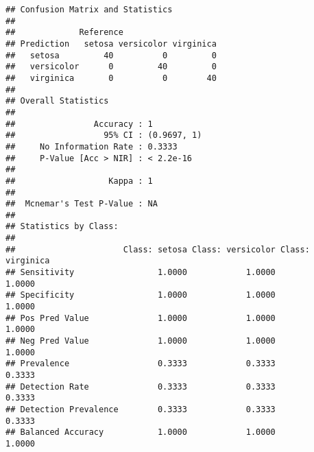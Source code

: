 \documentclass[
]{article}
\newenvironment{Shaded}{\begin{snugshade}}{\end{snugshade}}
\newcommand{\AttributeTok}[1]{\textcolor[rgb]{0.77,0.63,0.00}{#1}}
\newcommand{\CommentTok}[1]{\textcolor[rgb]{0.56,0.35,0.01}{\textit{#1}}}
\newcommand{\DecValTok}[1]{\textcolor[rgb]{0.00,0.00,0.81}{#1}}
\newcommand{\FunctionTok}[1]{\textcolor[rgb]{0.00,0.00,0.00}{#1}}
\newcommand{\NormalTok}[1]{#1}
\newcommand{\OtherTok}[1]{\textcolor[rgb]{0.56,0.35,0.01}{#1}}
\newcommand{\SpecialCharTok}[1]{\textcolor[rgb]{0.00,0.00,0.00}{#1}}
\begin{document}
\begin{Shaded}
\end{Shaded}

\begin{verbatim}
## Confusion Matrix and Statistics
## 
##             Reference
## Prediction   setosa versicolor virginica
##   setosa         40          0         0
##   versicolor      0         40         0
##   virginica       0          0        40
## 
## Overall Statistics
##                                      
##                Accuracy : 1          
##                  95% CI : (0.9697, 1)
##     No Information Rate : 0.3333     
##     P-Value [Acc > NIR] : < 2.2e-16  
##                                      
##                   Kappa : 1          
##                                      
##  Mcnemar's Test P-Value : NA         
## 
## Statistics by Class:
## 
##                      Class: setosa Class: versicolor Class: virginica
## Sensitivity                 1.0000            1.0000           1.0000
## Specificity                 1.0000            1.0000           1.0000
## Pos Pred Value              1.0000            1.0000           1.0000
## Neg Pred Value              1.0000            1.0000           1.0000
## Prevalence                  0.3333            0.3333           0.3333
## Detection Rate              0.3333            0.3333           0.3333
## Detection Prevalence        0.3333            0.3333           0.3333
## Balanced Accuracy           1.0000            1.0000           1.0000
\end{verbatim}

\begin{Shaded}
\end{Shaded}
\end{document}
